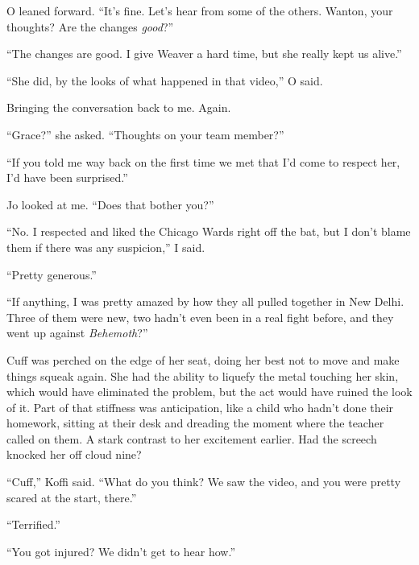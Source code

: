 O leaned forward.  ``It's fine.  Let's hear from some of the others.  Wanton, your thoughts?  Are the changes \emph{good}?''



``The changes are good.  I give Weaver a hard time, but she really kept us alive.''



``She did, by the looks of what happened in that video,'' O said.



Bringing the conversation back to me.  Again.



``Grace?'' she asked.  ``Thoughts on your team member?''



``If you told me way back on the first time we met that I'd come to respect her, I'd have been surprised.''



Jo looked at me.  ``Does that bother you?''



``No.  I respected and liked the Chicago Wards right off the bat, but I don't blame them if there was any suspicion,'' I said.



``Pretty generous.''



``If anything, I was pretty amazed by how they all pulled together in New Delhi.  Three of them were new, two hadn't even been in a real fight before, and they went up against \emph{Behemoth}?''



Cuff was perched on the edge of her seat, doing her best not to move and make things squeak again.  She had the ability to liquefy the metal touching her skin, which would have eliminated the problem, but the act would have ruined the look of it.  Part of that stiffness was anticipation, like a child who hadn't done their homework, sitting at their desk and dreading the moment where the teacher called on them.  A stark contrast to her excitement earlier.  Had the screech knocked her off cloud nine?



``Cuff,'' Koffi said.  ``What do you think?  We saw the video, and you were pretty scared at the start, there.''



``Terrified.''



``You got injured?  We didn't get to hear how.''




